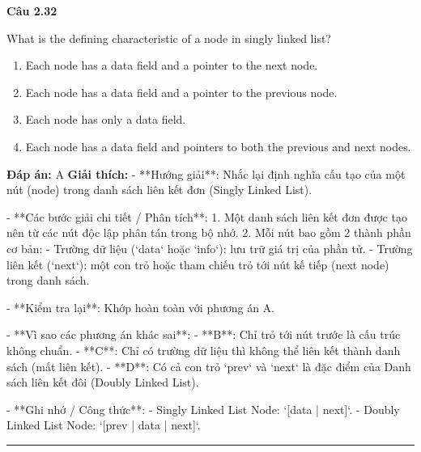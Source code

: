 \documentclass[11pt,a4paper]{article}
\newenvironment{question}[1]{%
  \par\vspace{1em}\noindent\textbf{\large Câu #1}\par\vspace{0.4em}
}{%
  \par\vspace{1em}\hrule\vspace{0.6em}
}
\newenvironment{choices}{%
  \begin{enumerate}[label=\textbf{\Alph*.},leftmargin=2.2em,itemsep=2pt,topsep=3pt]
}{%
  \end{enumerate}
}
\newcommand{\choice}{\item}
\begin{document}
\begin{question}{2.32}
What is the defining characteristic of a node in singly linked list?
\begin{choices}
\choice Each node has a data field and a pointer to the next node.
\choice Each node has a data field and a pointer to the previous node.
\choice Each node has only a data field.
\choice Each node has a data field and pointers to both the previous and next nodes.
\end{choices}
\textbf{Đáp án:} A
\textbf{Giải thích:} - **Hướng giải**:
  Nhắc lại định nghĩa cấu tạo của một nút (node) trong danh sách liên kết đơn (Singly Linked List).

- **Các bước giải chi tiết / Phân tích**:
  1. Một danh sách liên kết đơn được tạo nên từ các nút độc lập phân tán trong bộ nhớ.
  2. Mỗi nút bao gồm 2 thành phần cơ bản:
     - Trường dữ liệu (`data` hoặc `info`): lưu trữ giá trị của phần tử.
     - Trường liên kết (`next`): một con trỏ hoặc tham chiếu trỏ tới nút kế tiếp (next node) trong danh sách.

- **Kiểm tra lại**:
  Khớp hoàn toàn với phương án A.

- **Vì sao các phương án khác sai**:
  - **B**: Chỉ trỏ tới nút trước là cấu trúc không chuẩn.
  - **C**: Chỉ có trường dữ liệu thì không thể liên kết thành danh sách (mất liên kết).
  - **D**: Có cả con trỏ `prev` và `next` là đặc điểm của Danh sách liên kết đôi (Doubly Linked List).

- **Ghi nhớ / Công thức**:
  - Singly Linked List Node: `[data | next]`.
  - Doubly Linked List Node: `[prev | data | next]`.
\end{question}
\end{document}

